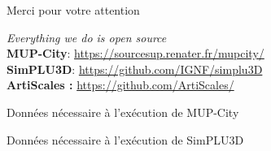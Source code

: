 \documentclass[xcolor=table]{beamer}
\begin{document}
\begin{frame}[standout]
	\centering
	\begin{block}{}	
		\centering	
		Merci pour votre attention
	\end{block}
	\begin{block}{}
		\centering
		\textit{Everything we do is open source}\\
		\large
		\textbf{MUP-City}: \url{https://sourcesup.renater.fr/mupcity/} \\
		\textbf{SimPLU3D}: \url{https://github.com/IGNF/simplu3D}\\
		\textbf{ArtiScales :} \url{https://github.com/ArtiScales/}
	\end{block}
\end{frame}

\begin{frame}{Données nécessaire à l'exécution de MUP-City}
\end{frame}
\begin{frame}{Données nécessaire à l'exécution de SimPLU3D}
\end{frame}
\end{document}
